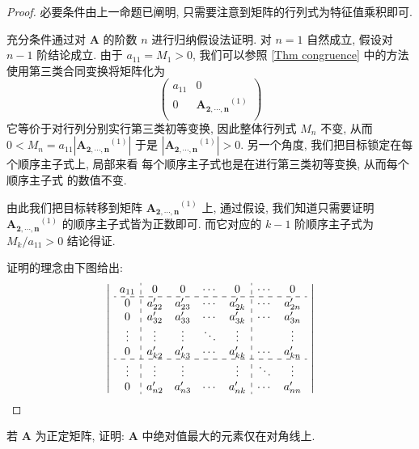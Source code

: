 \documentclass[UTF8]{book}
\begin{document}
\begin{proof}
    必要条件由上一命题已阐明, 只需要注意到矩阵的行列式为特征值乘积即可. 

    充分条件通过对 $\boldsymbol{A}$ 的阶数 $n$ 进行归纳假设法证明. 
    对 $n=1$ 自然成立, 假设对 $n-1$ 阶结论成立. 
    由于 $a_{11} = M_1 >0$, 我们可以参照 \ref{Thm congruence} 
    中的方法使用第三类合同变换将矩阵化为
    $$
    \begin{pmatrix}
        a_{11} & 0   \\
        0 & \boldsymbol{A_{2,\cdots,n}}^{(1)} \\
    \end{pmatrix}
    $$
    它等价于对行列分别实行第三类初等变换, 因此整体行列式 $M_n$ 不变, 
    从而 $0< M_n = a_{11}|\boldsymbol{A_{2,\cdots,n}}^{(1)}|$ 
    于是 $|\boldsymbol{A_{2,\cdots,n}}^{(1)}|>0$. 
    另一个角度, 我们把目标锁定在每个顺序主子式上, 局部来看
    每个顺序主子式也是在进行第三类初等变换, 从而每个顺序主子式
    的数值不变. 

    由此我们把目标转移到矩阵 $\boldsymbol{A_{2,\cdots,n}}^{(1)}$ 上, 
    通过假设, 我们知道只需要证明 $\boldsymbol{A_{2,\cdots,n}}^{(1)}$ 
    的顺序主子式皆为正数即可. 
    而它对应的 $k-1$ 阶顺序主子式为 
    $M_k /a_{11} >0$ 结论得证.
    
    证明的理念由下图给出: 
    $$
    \left| \,\,
    \begin{array}{c:cccc:cc}
        a_{11} & 0 & 0 & \cdots & 0 & \cdots & 0\\
        \hdashline
        0 & a'_{22} & a'_{23} & \cdots & a'_{2k} & \cdots & a'_{2n}\\
        0 & a'_{32} & a'_{33} & \cdots & a'_{3k} & \cdots & a'_{3n}\\
        \vdots & \vdots & \vdots & \ddots & \vdots &  & \vdots\\
        0 & a'_{k2} & a'_{k3} & \cdots & a'_{kk} & \cdots & a'_{kn}\\
        \hdashline
        \vdots & \vdots & \vdots &  & \vdots & \ddots & \vdots\\
        0 & a'_{n2} & a'_{n3} & \cdots & a'_{nk} & \cdots & a'_{nn}
    \end{array} 
    \,\, \right|
    $$
\end{proof}

\begin{exercise}
    若 $\boldsymbol{A}$ 为正定矩阵, 
    证明: $\boldsymbol{A}$ 中绝对值最大的元素仅在对角线上. 
\end{exercise}
\end{document}

